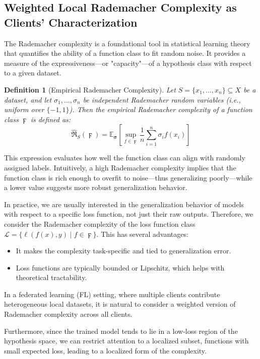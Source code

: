 \documentclass{article}
\newtheorem{definition}{Definition}
\begin{document}
\subsection{Weighted Local Rademacher Complexity as Clients' Characterization}

The Rademacher complexity is a foundational tool in statistical learning theory that quantifies the ability of a function class to fit random noise. It provides a measure of the expressiveness—or "capacity"—of a hypothesis class with respect to a given dataset.

\begin{definition}[Empirical Rademacher Complexity]
Let \( S = \{x_1, \dots, x_n\} \subseteq X \) be a dataset, and let \( \sigma_1, \dots, \sigma_n \) be independent Rademacher random variables (i.e., uniform over \( \{-1, 1\} \)). Then the empirical Rademacher complexity of a function class \( \digamma \) is defined as:
\[
\hat{\mathfrak{R}}_S(\digamma) = \mathbb{E}_{\boldsymbol{\sigma}} \left[ \sup_{f \in \digamma} \frac{1}{n} \sum_{i=1}^{n} \sigma_i f(x_i) \right]
\]
\end{definition}

This expression evaluates how well the function class can align with randomly assigned labels. Intuitively, a high Rademacher complexity implies that the function class is rich enough to overfit to noise—thus generalizing poorly—while a lower value suggests more robust generalization behavior.

In practice, we are usually interested in the generalization behavior of models with respect to a specific loss function, not just their raw outputs. Therefore, we consider the Rademacher complexity of the loss function class \( \mathcal{L} = \{ \ell(f(x), y) \mid f \in \digamma \} \). This has several advantages:
\begin{itemize}
    \item It makes the complexity task-specific and tied to generalization error.
    \item Loss functions are typically bounded or Lipschitz, which helps with theoretical tractability.
\end{itemize}

In a federated learning (FL) setting, where multiple clients contribute heterogeneous local datasets, it is natural to consider a weighted version of Rademacher complexity across all clients.

Furthermore, since the trained model tends to lie in a low-loss region of the hypothesis space, we can restrict attention to a localized subset, functions with small expected loss, leading to a localized form of the complexity.
\end{document}
